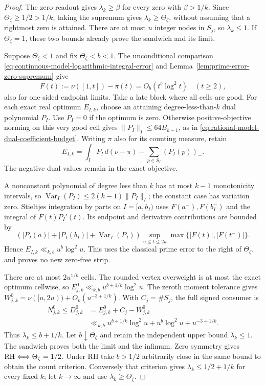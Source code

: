 \documentclass[11pt]{article}
\theoremstyle{definition}
\begin{document}
\begin{proof}
The zero readout gives $\lambda_k\ge\beta$ for every zero
with $\beta>1/k$. Since $\Theta_\zeta\ge1/2>1/k$, taking
the supremum gives $\lambda_k\ge\Theta_\zeta$, without
assuming that a rightmost zero is attained.
There are at most $u$ integer nodes in $S_j$, so
$\lambda_k\le1$. If $\Theta_\zeta=1$, these two bounds
already prove the sandwich and its limit.

Suppose $\Theta_\zeta<1$ and fix $\Theta_\zeta<b<1$.
The unconditional comparison
\eqref{eq:continuous-model-logarithmic-integral-error}
and Lemma~\ref{lem:prime-error-zero-supremum} give
\[
 F(t):=\nu([1,t])-\pi(t)=O_b(t^b\log^2 t)\quad(t\ge2),
\]
also for one-sided endpoint limits.
Take a late block where all cells are good.
For each exact real optimum $E_{I,k}$, choose an attaining
degree-less-than-$k$ dual polynomial $P_I$.
Use $P_I=0$ if the optimum is zero.
Otherwise positive-objective norming on this very good
cell gives $\|P_I\|_I\le64B_{k-1}$, as in
\eqref{eq:rational-model-dual-coefficient-budget}.
Writing $\pi$ also for its counting measure, retain
\begin{equation}
 E_{I,k}=\int_I P_I\,d(\nu-\pi)
                       -\sum_{p\in S_I}(P_I(p))_- .
 \label{eq:critical-prime-signed-cell-objective}
\end{equation}
The negative dual values remain in the exact objective.

A nonconstant polynomial of degree less than $k$ has at
most $k-1$ monotonicity intervals, so
$\operatorname{Var}_I(P_I)\le2(k-1)\|P_I\|_I$;
the constant case has variation zero.
Stieltjes integration by parts on $I=[a,b_I)$ uses
$F(a^-),F(b_I^-)$ and the integral of $F(t)P_I'(t)$.
Its endpoint and derivative contributions are bounded by
\[
 \left(|P_I(a)|+|P_I(b_I)|
                   +\operatorname{Var}_I(P_I)\right)
 \sup_{u\le t\le2u}\max\{|F(t)|,|F(t^-)|\}.
\]
Hence $E_{I,k}\ll_{k,b}u^b\log^2u$.
This uses the classical prime error to the right of
$\Theta_\zeta$, and proves no new zero-free strip.

There are at most $2u^{1/k}$ cells.
The rounded vertex overweight is at most the exact
optimum cellwise, so
$E^0_{j,k}\ll_{k,b}u^{b+1/k}\log^2u$.
The zeroth moment tolerance gives
$W^0_{j,k}=\nu([u,2u))+O_k(u^{-3+1/k})$.
With $C_j=\#S_j$, the full signed consumer is
\begin{equation}
 \begin{aligned}
 N^0_{j,k}\le D^0_{j,k}
    &=E^0_{j,k}+C_j-W^0_{j,k}\\
    &\ll_{k,b}u^{b+1/k}\log^2u
                       +u^b\log^2u+u^{-3+1/k}.
 \end{aligned}
 \label{eq:critical-prime-full-signed-count-bound}
\end{equation}
Thus $\lambda_k\le b+1/k$.
Let $b\downarrow\Theta_\zeta$ and retain the independent
upper bound $\lambda_k\le1$.
The sandwich proves both the limit and the infimum.
Zero symmetry gives
$ {\rm RH}\Longleftrightarrow\Theta_\zeta=1/2$.
Under RH take $b>1/2$ arbitrarily close in the same bound
to obtain the count criterion. Conversely that criterion
gives $\lambda_k\le1/2+1/k$ for every fixed $k$;
let $k\to\infty$ and use $\lambda_k\ge\Theta_\zeta$.
\end{proof}
\end{document}
